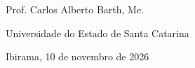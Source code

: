 \begin{folhadeaprovacao}
\begin{center}
		\vspace*{1.25cm}
		Prof. Carlos Alberto Barth, Me.\par
		Universidade do Estado de Santa Catarina
		
	
	
	\end{center}
    
    \vspace*{\fill}  
    \begin{center}
    {Ibirama, 10 de novembro de 2026}
	\end{center}
    \vspace*{0.25cm}  
\end{folhadeaprovacao}




%	
%	
%	
%	
